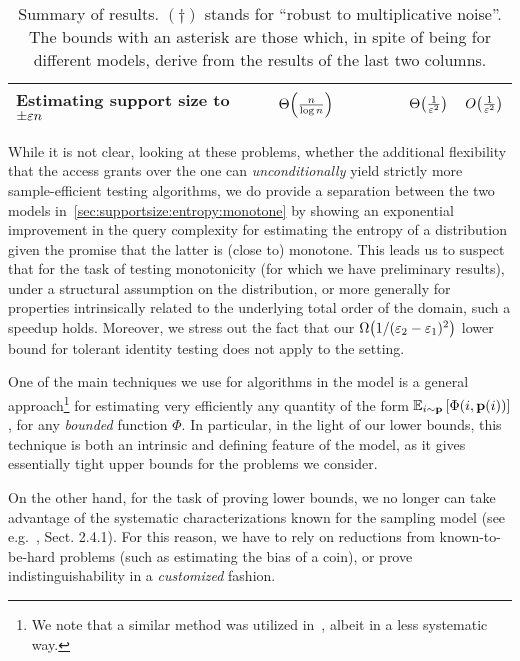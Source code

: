 \begin{table}[h]
\begin{adjustwidth}{-0.5in}{0.4in}
\begin{tabular}{|l|c|c|c||c|c|}
    \parbox{25mm}{ Estimating support size to $\pm\varepsilon n$ \strut } & $\bigTheta{\frac{n}{\log n}}$~\cite{ValiantValiant:11,ValiantValiant:10lb} & ~  & ~        & $\bigTheta{\frac{1}{\eps^{2}}}$             & $\bigO{\frac{1}{\eps^{2}}}$           \\ \hline
    \end{tabular}
\end{adjustwidth}
    \caption{\label{table:secextended:results} Summary of results. $(\dagger)$ stands for ``robust to multiplicative noise''. The bounds with an asterisk are those which, in spite of being for different models, derive from the results of the last two columns.}
\end{table}
 
While it is not clear, looking at these problems, whether the additional flexibility that the \Cdfsamp access grants over the \Pdfsamp one can \emph{unconditionally} yield strictly more sample-efficient testing algorithms, we do provide a separation between the two models in~\cref{sec:supportsize:entropy:monotone} by showing an exponential improvement in the query complexity for estimating the entropy of a distribution given the promise that the latter is (close to) monotone. This leads us to suspect that for the task of testing monotonicity (for which we have preliminary results), under a structural assumption on the distribution, or more generally for properties intrinsically related to the underlying total order of the domain, such a speedup holds.  Moreover, we stress out the fact that our $\bigOmega{1/(\eps_2-\eps_1)^2}$ lower bound for tolerant identity testing does not apply to the \Cdfsamp setting.

One of the main techniques we use for algorithms in the \pdfsamp model is a general approach\footnote{We note that a similar method was utilized in~\cite{BDKR:05}, albeit in a less systematic way.}{} for estimating very efficiently any quantity of the form
$\mathbb{E}_{i\sim \mathbf{p}}\left[ \Phi(i,\mathbf{p}(i)) \right]$, for any \emph{bounded} function $\Phi$. In particular, in the light of our lower bounds, this technique is both an intrinsic and defining feature of the \Pdfsamp model, as it gives essentially tight upper bounds for the problems we consider.

On the other hand, for the task of proving lower bounds, we no longer can take advantage of the systematic characterizations known for the sampling model  (see e.g.~\cite{BarYossef:02}, Sect. 2.4.1). For this reason, we have to rely on reductions from known-to-be-hard problems (such as estimating the bias of a coin), or prove indistinguishability in a \emph{customized} fashion.
  
